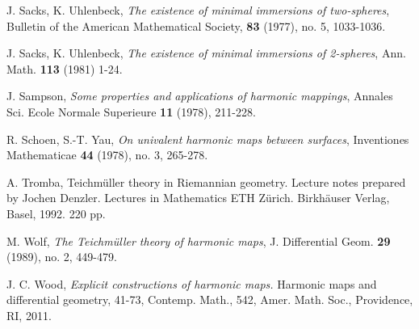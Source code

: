 \documentclass[11pt]{amsart}
\numberwithin{equation}{section}
\theoremstyle{plain}
\theoremstyle{definition}
\theoremstyle{definition}
\begin{document}
\begin{thebibliography}{99}


 J. Sacks, K. Uhlenbeck, {\it The existence of minimal immersions of two-spheres}, Bulletin of
the American Mathematical Society, {\bf 83} (1977), no. 5, 1033-1036. 

 J. Sacks, K. Uhlenbeck, {\it The existence of minimal immersions of 2-spheres}, Ann. Math. {\bf 113} (1981) 1-24. 





 J. Sampson, {\it Some properties and applications of harmonic mappings}, Annales Sci. Ecole Normale Superieure {\bf 11} (1978), 211-228.


 R. Schoen, S.-T. Yau,  {\it On univalent harmonic maps between surfaces}, Inventiones Mathematicae {\bf 44} (1978), no. 3, 265-278.



 A. Tromba,  Teichm\"uller theory in Riemannian geometry. Lecture notes prepared by Jochen Denzler. Lectures in Mathematics ETH Z\"urich. Birkh\"auser Verlag, Basel, 1992. 220 pp.

 M. Wolf, {\it The Teichm\"uller theory of harmonic maps}, J. Differential Geom. {\bf 29} (1989), no. 2, 449-479.

 J. C. Wood, {\it Explicit constructions of harmonic maps.} Harmonic maps and differential geometry, 41-73, Contemp. Math., 542, Amer. Math. Soc., Providence, RI, 2011.


\end{thebibliography}
\end{document}
